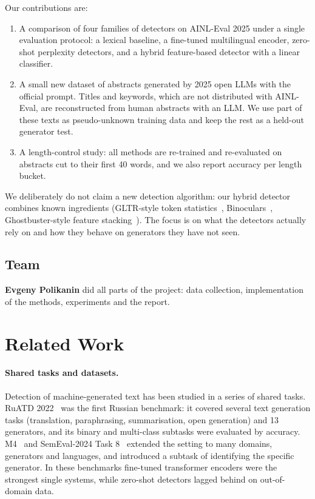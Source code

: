 \documentclass{article}
\begin{document}
Our contributions are:
\begin{enumerate}
    \item A comparison of four families of detectors on AINL-Eval 2025 under a single evaluation protocol: a lexical baseline, a fine-tuned multilingual encoder, zero-shot perplexity detectors, and a hybrid feature-based detector with a linear classifier.
    \item A small new dataset of abstracts generated by 2025 open LLMs with the official prompt. Titles and keywords, which are not distributed with AINL-Eval, are reconstructed from human abstracts with an LLM. We use part of these texts as pseudo-unknown training data and keep the rest as a held-out generator test.
    \item A length-control study: all methods are re-trained and re-evaluated on abstracts cut to their first 40 words, and we also report accuracy per length bucket.
\end{enumerate}
We deliberately do not claim a new detection algorithm: our hybrid detector combines known ingredients (GLTR-style token statistics~\cite{gltr}, Binoculars~\cite{binoculars}, Ghostbuster-style feature stacking~\cite{ghostbuster}). The focus is on what the detectors actually rely on and how they behave on generators they have not seen.

\subsection{Team}
\textbf{Evgeny Polikanin} did all parts of the project: data collection, implementation of the methods, experiments and the report.



\section{Related Work}
\label{sec:related}

\paragraph{Shared tasks and datasets.}
Detection of machine-generated text has been studied in a series of shared tasks. RuATD 2022~\cite{ruatd2022} was the first Russian benchmark: it covered several text generation tasks (translation, paraphrasing, summarisation, open generation) and 13 generators, and its binary and multi-class subtasks were evaluated by accuracy. M4~\cite{m4} and SemEval-2024 Task 8~\cite{semeval2024task8} extended the setting to many domains, generators and languages, and introduced a subtask of identifying the specific generator. In these benchmarks fine-tuned transformer encoders were the strongest single systems, while zero-shot detectors lagged behind on out-of-domain data.
\end{document}
